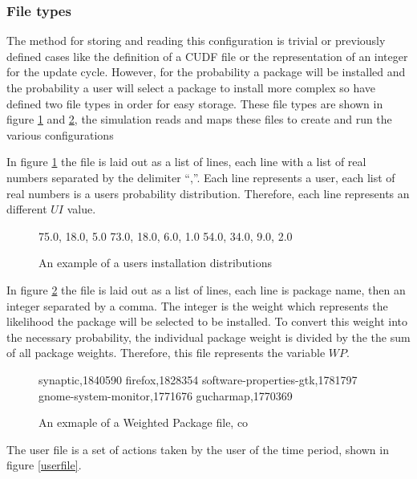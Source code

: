 \subsubsection{File types}
The method for storing and reading this configuration is trivial or previously defined cases like the definition of a CUDF file or the representation of an integer for the update cycle.
However, for the probability a package will be installed and the probability a user will select a package to install more complex so have defined two file types in order for easy storage.
These file types are shown in figure \ref{userprob} and \ref{packageprob}, the simulation reads and maps these files to create and run the various configurations

In figure \ref{userprob} the file is laid out as a list of lines, each line with a list of real numbers separated by the delimiter ``,''.
Each line represents a user, each list of real numbers is a users probability distribution.
Therefore, each line represents an different $UI$ value.

\begin{figure}[htp]
\begin{center}
75.0, 18.0, 5.0
73.0, 18.0, 6.0, 1.0
54.0, 34.0, 9.0, 2.0
\caption[Install Distribution Example File]{An example of a users installation distributions}
\label{userprob}
\end{center}
\end{figure}

In figure \ref{packageprob} the file is laid out as a list of lines, each line is package name, then an integer separated by a comma.
The integer is the weight which represents the likelihood the package will be selected to be installed.
To convert this weight into the necessary probability, the individual package weight is divided by the the sum of all package weights. 
Therefore, this file represents the variable $WP$.

\begin{figure}[htp]
\begin{center}
synaptic,1840590
firefox,1828354
software-properties-gtk,1781797
gnome-system-monitor,1771676
gucharmap,1770369
\caption[Weighted Package File Example]{An exmaple of a Weighted Package file, co }
\label{packageprob}
\end{center}
\end{figure}

The user file is a set of actions taken by the user of the time period, shown in figure \ref{userfile}.

